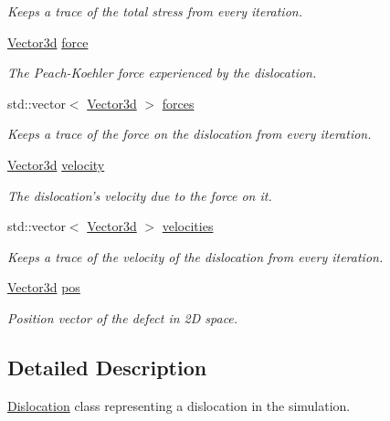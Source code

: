 \begin{DoxyCompactItemize}
\begin{DoxyCompactList}\small\item\em \-Keeps a trace of the total stress from every iteration. \end{DoxyCompactList}\item 
\hyperlink{classVector3d}{\-Vector3d} \hyperlink{classDislocation_a9c19c7493d896bd845c489e1ec3cbbb6}{force}
\begin{DoxyCompactList}\small\item\em \-The \-Peach-\/\-Koehler force experienced by the dislocation. \end{DoxyCompactList}\item 
std\-::vector$<$ \hyperlink{classVector3d}{\-Vector3d} $>$ \hyperlink{classDislocation_aa8f4567bbfc6a58aaad01d5c423658c1}{forces}
\begin{DoxyCompactList}\small\item\em \-Keeps a trace of the force on the dislocation from every iteration. \end{DoxyCompactList}\item 
\hyperlink{classVector3d}{\-Vector3d} \hyperlink{classDislocation_ad6f4e8e94b2525c2e58a77b9d2916c0e}{velocity}
\begin{DoxyCompactList}\small\item\em \-The dislocation's velocity due to the force on it. \end{DoxyCompactList}\item 
std\-::vector$<$ \hyperlink{classVector3d}{\-Vector3d} $>$ \hyperlink{classDislocation_a9ccdef63384a8b965e70f13920a852f8}{velocities}
\begin{DoxyCompactList}\small\item\em \-Keeps a trace of the velocity of the dislocation from every iteration. \end{DoxyCompactList}\item 
\hyperlink{classVector3d}{\-Vector3d} \hyperlink{classDefect_aed2731c1beefc22e3db6ad5b18194cdd}{pos}
\begin{DoxyCompactList}\small\item\em \-Position vector of the defect in 2\-D space. \end{DoxyCompactList}\end{DoxyCompactItemize}


\subsection{\-Detailed \-Description}
\hyperlink{classDislocation}{\-Dislocation} class representing a dislocation in the simulation. 

